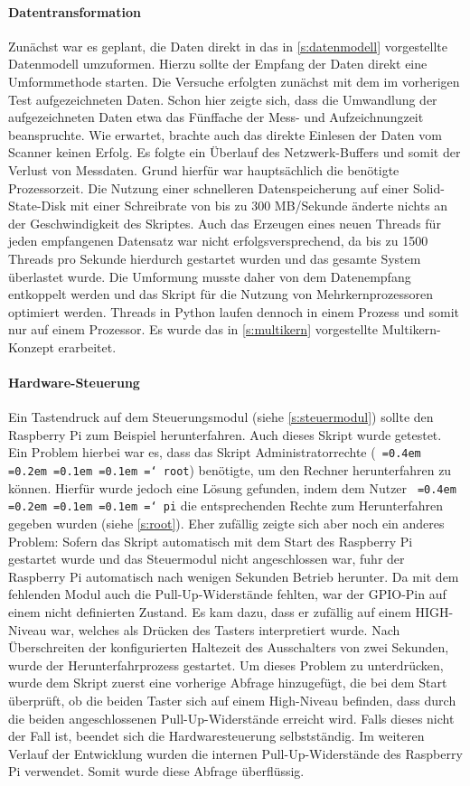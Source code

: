 \documentclass[a4paper,12pt,bibliography=totoc, listof=totoc,titlepage,pointlessnumbers]{scrreprt}
\newcommand*\justify{%
  \fontdimen2\font=0.4em%
  \fontdimen3\font=0.2em%
  \fontdimen4\font=0.1em%
  \fontdimen7\font=0.1em%
  \hyphenchar\font=`\-%
}
\newcommand{\code}[1]{\texttt{\justify{#1}}}
\begin{document}
\paragraph{Datentransformation}
Zunächst war es geplant, die Daten direkt in das in \autoref{s:datenmodell} vorgestellte Datenmodell umzuformen. Hierzu sollte der Empfang der Daten direkt eine Umformmethode starten. Die Versuche erfolgten zunächst mit dem im vorherigen Test aufgezeichneten Daten. Schon hier zeigte sich, dass die Umwandlung der aufgezeichneten Daten etwa das Fünffache der Mess- und Aufzeichnungzeit beanspruchte. Wie erwartet, brachte auch das direkte Einlesen der Daten vom Scanner keinen Erfolg. Es folgte ein Überlauf des Netzwerk-Buffers und somit der Verlust von Messdaten. Grund hierfür war hauptsächlich die benötigte Prozessorzeit. Die Nutzung einer schnelleren Datenspeicherung auf einer Solid-State-Disk mit einer Schreibrate von bis zu 300 MB/Sekunde änderte nichts an der Geschwindigkeit des Skriptes. Auch das Erzeugen eines neuen Threads für jeden empfangenen Datensatz war nicht erfolgsversprechend, da bis zu 1500 Threads pro Sekunde hierdurch gestartet wurden und das gesamte System überlastet wurde. Die Umformung musste daher von dem Datenempfang entkoppelt werden und das Skript für die Nutzung von Mehrkernprozessoren optimiert werden. Threads in Python laufen dennoch in einem Prozess und somit nur auf einem Prozessor. Es wurde das in \autoref{s:multikern} vorgestellte Multikern-Konzept erarbeitet.

\paragraph{Hardware-Steuerung}
Ein Tastendruck auf dem Steuerungsmodul (siehe \autoref{s:steuermodul}) sollte den Rasp\-berry Pi zum Beispiel herunterfahren. Auch dieses Skript wurde getestet. Ein Problem hierbei war es, dass das Skript Administratorrechte (\code{root}) benötigte, um den Rechner herunterfahren zu können. Hierfür wurde jedoch eine Lösung gefunden, indem dem Nutzer \code{pi} die entsprechenden Rechte zum Herunterfahren gegeben wurden (siehe \autoref{s:root}). Eher zufällig zeigte sich aber noch ein anderes Problem: Sofern das Skript automatisch mit dem Start des Rasp\-berry Pi gestartet wurde und das Steuermodul nicht angeschlossen war, fuhr der Rasp\-berry Pi automatisch nach wenigen Sekunden Betrieb herunter. Da mit dem fehlenden Modul auch die Pull-Up-Widerstände fehlten, war der GPIO-Pin auf einem nicht definierten Zustand. Es kam dazu, dass er zufällig auf einem HIGH-Niveau war, welches als Drücken des Tasters interpretiert wurde. Nach Überschreiten der konfigurierten Haltezeit des Ausschalters von zwei Sekunden, wurde der Herunterfahrprozess gestartet. Um dieses Problem zu unterdrücken, wurde dem Skript zuerst eine vorherige Abfrage hinzugefügt, die bei dem Start überprüft, ob die beiden Taster sich auf einem High-Niveau befinden, dass durch die beiden angeschlossenen Pull-Up-Widerstände erreicht wird. Falls dieses nicht der Fall ist, beendet sich die Hardwaresteuerung selbst\-stän\-dig. Im weiteren Verlauf der Entwicklung wurden die internen Pull-Up-Widerstände des Rasp\-berry Pi verwendet. Somit wurde diese Abfrage überflüssig.
\end{document}
